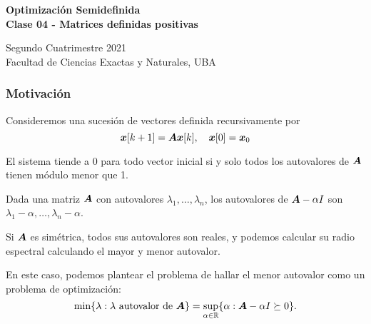 \documentclass[aspectratio=169,12pt,spanish]{beamer}
\begin{document}

\begin{frame}

 \begin{center}

\Large\textbf{Optimización Semidefinida} \\
\large\textbf{Clase 04 - Matrices definidas positivas}




\vspace{1cm}
 Segundo Cuatrimestre 2021
 \\
 {\small Facultad de Ciencias Exactas y Naturales, UBA}
 \end{center}

\end{frame}




\begin{frame}
\frametitle{Motivación}

Consideremos una sucesión de vectores definida recursivamente por
$$
\bm{x}[k + 1] = \bm{A} \bm{x}[k], \quad \bm{x}[0] = \bm{x}_0
$$

El sistema tiende a 0 para todo vector inicial si y solo todos los autovalores de $\bm{A}$ tienen módulo menor que 1.

Dada una matriz $\bm{A}$ con autovalores $\lambda_1, \dots, \lambda_n$, los autovalores de $\bm{A} - \alpha I$ son $\lambda_1 - \alpha, \dots, \lambda_n - \alpha$.

Si $\bm{A}$ es simétrica, todos sus autovalores son reales, y podemos calcular su radio espectral calculando el mayor y menor autovalor.

En este caso, podemos plantear el problema de hallar el menor autovalor como un problema de optimización:
$$
\min \{\lambda : \lambda \text{ autovalor de $\bm{A}$}\} = \sup_{\alpha \in \mathbb{R}} \{\alpha : \bm{A} - \alpha I \succeq 0\}.
$$

\end{frame}
\end{document}
